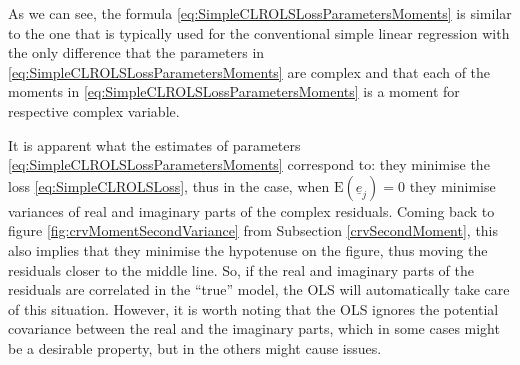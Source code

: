 \documentclass[
]{book}
\begin{document}
As we can see, the formula \eqref{eq:SimpleCLROLSLossParametersMoments} is similar to the one that is typically used for the conventional simple linear regression with the only difference that the parameters in \eqref{eq:SimpleCLROLSLossParametersMoments} are complex and that each of the moments in \eqref{eq:SimpleCLROLSLossParametersMoments} is a moment for respective complex variable.

It is apparent what the estimates of parameters \eqref{eq:SimpleCLROLSLossParametersMoments} correspond to: they minimise the loss \eqref{eq:SimpleCLROLSLoss}, thus in the case, when \(\mathrm{E}(\underline{e}_j)=0\) they minimise variances of real and imaginary parts of the complex residuals. Coming back to figure \ref{fig:crvMomentSecondVariance} from Subsection \ref{crvSecondMoment}, this also implies that they minimise the hypotenuse on the figure, thus moving the residuals closer to the middle line. So, if the real and imaginary parts of the residuals are correlated in the ``true'' model, the OLS will automatically take care of this situation. However, it is worth noting that the OLS ignores the potential covariance between the real and the imaginary parts, which in some cases might be a desirable property, but in the others might cause issues.
\end{document}
